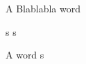 \documentclass{scrbook}
\begin{document}
\beginnumbering
\pstart
A  Blablabla  word
\pend
\endnumbering

s
s

\beginnumbering
\pstart
A  word
\pend
\endnumbering
s
\end{document}
